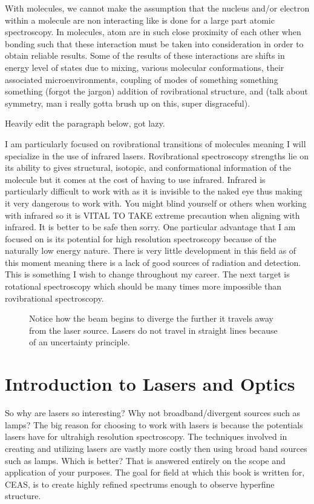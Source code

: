 \documentclass[11pt,a4paper]{book}
\newcommand{\imginput}[1]{} %
\begin{document}
		With molecules, we cannot make the assumption that the nucleus and/or electron within a molecule are non interacting like is done for a large part atomic spectroscopy. In molecules, atom are in such close proximity of each other when bonding such that these interaction must be taken into consideration in order to obtain reliable results. Some of the results of these interactions are shifts in energy level of states due to mixing, various molecular conformations, their associated microenvironments, coupling of modes of something something something (forgot the jargon) addition of rovibrational structure, and (talk about symmetry, man i really gotta brush up on this, super disgraceful). 
		
		
		Heavily edit the paragraph below, got lazy.
		
		I am particularly focused on rovibrational transitions of molecules meaning I will specialize in the use of infrared lasers. Rovibrational spectroscopy strengths lie on its ability to gives structural, isotopic, and conformational information of the molecule but it comes at the cost of having to use infrared. Infrared is particularly difficult to work with as it is invisible to the naked eye thus making it very dangerous to work with. You might blind yourself or others when working with infrared so it is VITAL TO TAKE extreme precaution when aligning with infrared. It is better to be safe then sorry. One particular advantage that I am focused on is its potential for high resolution spectroscopy because of the naturally low energy nature. There is very little development in this field as of this moment meaning there is a lack of good sources of radiation and detection. This is something I wish to change throughout my career. The next target is rotational spectroscopy which should be many times more impossible than rovibrational spectroscopy.
		
		\begin{figure} [!ht]
			\centering
			\def\svgwidth{\columnwidth}
			\Huge
			\resizebox{10cm}{!}{\imginput{images/laser-gaussian-beam.pdf_tex}}
			\caption{Notice how the beam begins to diverge the further it travels away from the laser source. Lasers do not travel in straight lines because of an uncertainty principle.}
			\label{fig:laser-gaussian-beam}
		\end{figure}
		
	\section{Introduction to Lasers and Optics}	
		\label{sec:Introduction to Lasers and Optics}
		So why are lasers so interesting? Why not broadband/divergent sources such as lamps? The  big reason for choosing to work with lasers is because the potentials lasers have for ultrahigh resolution spectroscopy. The techniques involved in creating and utilizing lasers are vastly more costly then using broad band sources such as lamps. Which is better? That is answered entirely on the scope and application of your purposes. The goal for field at which this book is written for, CEAS, is to create highly refined spectrums enough to observe hyperfine structure. 
		
\end{document}
